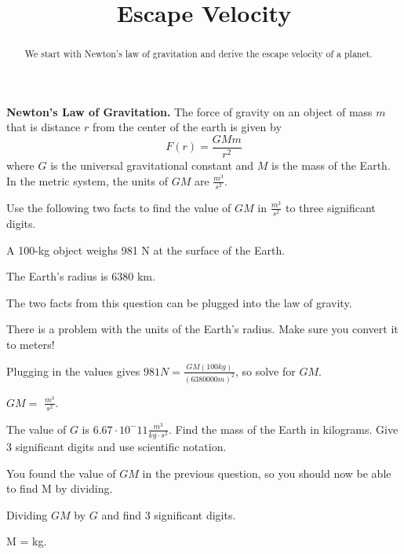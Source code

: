 \documentclass{ximera}
\title{Escape Velocity}
\begin{document}
\begin{abstract}
We start with Newton's law of gravitation and derive the escape velocity of a planet.
\end{abstract}
\maketitle

\begin{observation}
\textbf{Newton's Law of Gravitation.} The force of gravity on an object of mass $m$ that is distance $r$ from the center of the earth is given by
$$ F(r) = \frac{G M m}{r^2}$$
where $G$ is the universal gravitational constant and $M$ is the mass of the Earth. In the metric system, the units of $G M$ are $\frac{m^3}{s^2}$.
\end{observation}

\begin{question}
Use the following two facts to find the value of $GM$ in $\frac{m^3}{s^2}$ to three significant digits. 
\begin{observation} A 100-kg object weighs 981 N at the surface of the Earth. \end{observation}
\begin{observation} The Earth's radius is 6380 km. \end{observation}

\begin{solution}
\begin{hint}
The two facts from this question can be plugged into the law of gravity.
\end{hint}
\begin{hint}
There is a problem with the units of the Earth's radius. Make sure you convert it to meters!
\end{hint}
\begin{hint}
Plugging in the values gives $981 N = \frac{GM (100 kg)}{(6380000 m)^2}$, so solve for $GM$.
\end{hint}
$GM =$  $\frac{m^3}{s^2}$.
\end{solution}
\end{question}

\begin{question}
The value of $G$ is $6.67 \cdot 10^-{11} \frac{m^3}{kg \cdot s^2}$. Find the mass of the Earth in kilograms. Give 3 significant digits and use scientific notation.
\begin{solution}
\begin{hint}
You found the value of $G M$ in the previous question, so you should now be able to find M by dividing.
\end{hint}
\begin{hint}
Dividing $G M$ by $G$ and find 3 significant digits. 
\end{hint}
M =  kg.
\end{solution}
\end{question}
\end{document}
